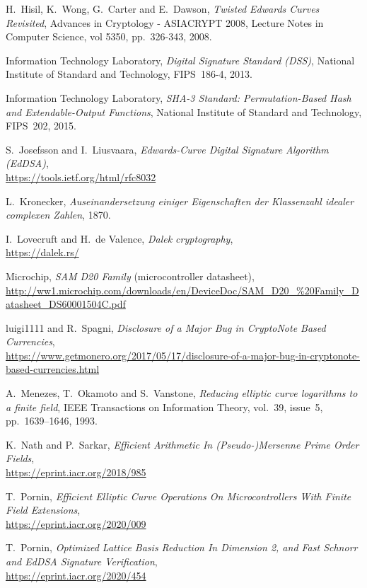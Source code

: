 \documentclass{llncs}
\begin{document}
\begin{thebibliography}{20}
H.~Hisil, K.~Wong, G.~Carter and E.~Dawson,
\emph{Twisted Edwards Curves Revisited},
Advances in Cryptology - ASIACRYPT 2008, Lecture Notes in Computer Science,
vol 5350, pp.~326-343, 2008.

Information Technology Laboratory,
\emph{Digital Signature Standard (DSS)},
National Institute of Standard and Technology, FIPS~186-4, 2013.

Information Technology Laboratory,
\emph{SHA-3 Standard: Permutation-Based Hash and Extendable-Output Functions},
National Institute of Standard and Technology, FIPS~202, 2015.

S.~Josefsson and I.~Liusvaara,
\emph{Edwards-Curve Digital Signature Algorithm (EdDSA)},\\
\url{https://tools.ietf.org/html/rfc8032}

L.~Kronecker,
\emph{Auseinandersetzung einiger Eigenschaften der Klassenzahl idealer
complexen Zahlen}, 1870.

I.~Lovecruft and H.~de Valence,
\emph{Dalek cryptography},\\
\url{https://dalek.rs/}

Microchip,
\emph{SAM D20 Family} (microcontroller datasheet),
\url{http://ww1.microchip.com/downloads/en/DeviceDoc/SAM_D20_%20Family_Datasheet_DS60001504C.pdf}

luigi1111 and R.~Spagni,
\emph{Disclosure of a Major Bug in CryptoNote Based Currencies},\\
\url{https://www.getmonero.org/2017/05/17/disclosure-of-a-major-bug-in-cryptonote-based-currencies.html}

A.~Menezes, T.~Okamoto and S.~Vanstone,
\emph{Reducing elliptic curve logarithms to a finite field},
IEEE Transactions on Information Theory, vol.~39, issue~5,
pp.~1639–1646, 1993.

K.~Nath and P.~Sarkar,
\emph{Efficient Arithmetic In (Pseudo-)Mersenne Prime Order Fields},\\
\url{https://eprint.iacr.org/2018/985}

T.~Pornin,
\emph{Efficient Elliptic Curve Operations On Microcontrollers With
Finite Field Extensions},\\
\url{https://eprint.iacr.org/2020/009}

T.~Pornin,
\emph{Optimized Lattice Basis Reduction In Dimension 2, and Fast Schnorr
and EdDSA Signature Verification},\\
\url{https://eprint.iacr.org/2020/454}


\end{thebibliography}
\end{document}
